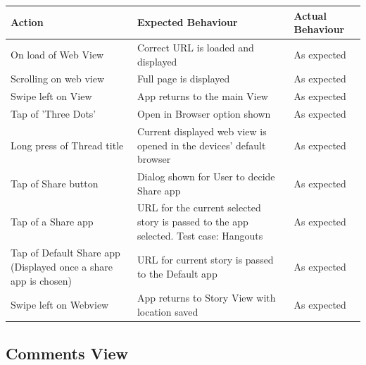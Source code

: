 \documentclass[11pt]{article}
\begin{document}
\begin{center}
\begin{tabular}{ | p{5cm} | p{5cm} | p{5cm} |}
	\hline
	\textbf{Action} & \textbf{Expected Behaviour} & \textbf{Actual Behaviour} \\
    \hline
	On load of Web View & Correct URL is loaded and displayed & As expected \\
	\hline
	Scrolling on web view & Full page is displayed & As expected \\
	\hline
	Swipe left on View & App returns to the main View & As expected \\
	\hline
	Tap of 'Three Dots' & Open in Browser option shown & As expected \\
	\hline
	Long press of Thread title & Current displayed web view is opened in the devices' default browser & As expected \\
	\hline
	Tap of Share button & Dialog shown for User to decide Share app & As expected \\
	\hline
Tap of a Share app & URL for the current selected story is passed to the app selected. Test case: Hangouts & As expected \\
	\hline
Tap of Default Share app (Displayed once a share app is chosen) & URL for current story is passed to the Default app & As expected \\
	\hline
Swipe left on Webview & App returns to Story View with location saved & As expected \\
	\hline

\end{tabular}
\end{center}

\subsection*{Comments View}
\end{document}
